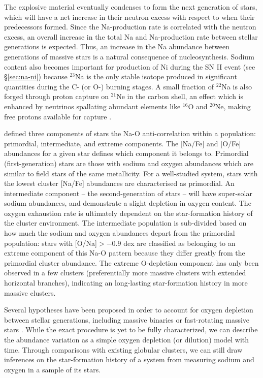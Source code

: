 \documentclass{emulateapj}
\begin{document}
The explosive material eventually condenses to form the next generation of stars, which will have a net increase in their neutron excess with respect to when their predecessors formed. Since the Na-production rate is correlated with the neutron excess, an overall increase in the total Na and Na-production rate between stellar generations is expected. Thus, an increase in the Na abundance between generations of massive stars is a natural consequence of nucleosynthesis. Sodium content also becomes important for production of Ni during the SN II event (see \S\ref{sec:na-ni}) because $^{23}$Na is the only stable isotope produced in significant quantities during the C- (or O-) burning stages. A small fraction of $^{22}$Na is also forged through proton capture on $^{21}$Ne in the carbon shell, an effect which is enhanced by neutrinos spallating abundant elements like $^{16}$O and $^{20}$Ne, making free protons available for capture \citep{woosley;weaver_1995}.

\citet{carretta;et-al_2009_na_o} defined three components of stars the Na-O anti-correlation within a population: primordial, intermediate, and extreme components. The [Na/Fe] and [O/Fe] abundances for a given star defines which component it belongs to. Primordial (first-generation) stars are those with sodium and oxygen abundances which are similar to field stars of the same metallicity. For a well-studied system, stars with the lowest cluster [Na/Fe] abundances are characterised as primordial. An intermediate component \--- the second-generation of stars \--- will have super-solar sodium abundances, and demonstrate a slight depletion in oxygen content. The oxygen exhaustion rate is ultimately dependent on the star-formation history of the cluster environment. The intermediate population is sub-divided based on how much the sodium and oxygen abundances depart from the primordial population: stars with [O/Na]$ > -0.9$ dex are classified as belonging to an extreme component of this Na-O pattern because they differ greatly from the primordial cluster abundance. The extreme O-depletion component has only been observed in a few clusters (preferentially more massive clusters with extended horizontal branches), indicating an long-lasting star-formation history in more massive clusters.


Several hypotheses have been proposed in order to account for oxygen depletion between stellar generations, including massive binaries \citep{de_mink;et-al_2009} or fast-rotating massive stars \citep{decressin;et-al_2007}. While the exact procedure is yet to be fully characterized, we can describe the abundance variation as a simple oxygen depletion (or dilution) model with time. Through comparisons with existing globular clusters, we can still draw inferences on the star-formation history of a system from measuring sodium and oxygen in a sample of its stars.
\end{document}
